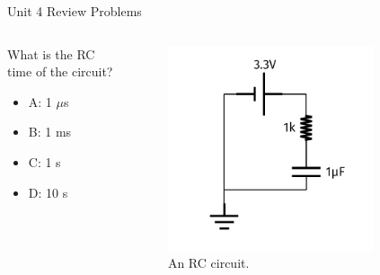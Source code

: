 \documentclass{beamer}
\begin{document}
\begin{frame}{Unit 4 Review Problems}
\begin{columns}[T]
\begin{column}{0.5\textwidth}
What is the RC time of the circuit?
\begin{itemize}
\item A: 1 $\mu$s
\item B: 1 ms
\item C: 1 s
\item D: 10 s
\end{itemize}
\end{column}
\begin{column}{0.5\textwidth}
\begin{figure}
\centering
\includegraphics[width=0.8\textwidth]{figures/iVCurve7.pdf}
\caption{\label{fig:RC1} An RC circuit.}
\end{figure}
\end{column}
\end{columns}
\end{frame}
\end{document}
